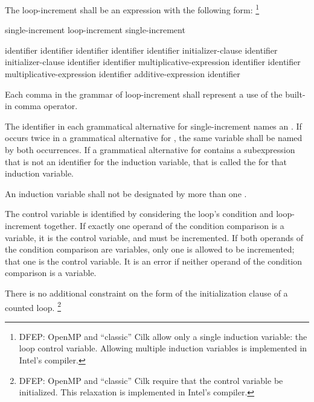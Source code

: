 \pnum
The loop-increment shall be an expression with the following form:%
\footnote{DFEP:
OpenMP and ``classic'' Cilk allow only a single induction variable:
the loop control variable.
Allowing multiple induction variables is implemented in Intel's compiler.
}

\begin{bnf}
\br
single-increment
\br
loop-increment \terminal{,} single-increment
\end{bnf}

\begin{bnf}
\br
identifier \terminal{++}
\br
identifier \terminal{--}
\br
\terminal{++} identifier
\br
\terminal{--} identifier
\br
identifier \terminal{+=} initializer-clause
\br
identifier \terminal{-=} initializer-clause
\br
identifier \terminal{=} identifier \terminal{+} multiplicative-expression
\br
identifier \terminal{=} identifier \terminal{-} multiplicative-expression
\br
identifier \terminal{=} additive-expression \terminal{+} identifier
\end{bnf}

\pnum
\begin{cpp}
Each comma in the grammar of loop-increment shall represent
a use of the built-in comma operator.
\end{cpp}
The identifier in each grammatical alternative for single-increment
names an
.
If
occurs twice in a grammatical alternative for
,
the same variable shall be named by both occurrences.
If a grammatical alternative for
contains a subexpression
that is not an identifier for the induction variable,
that is called the
for that induction variable.

\pnum
An induction variable shall not be designated by more than one
.

\begin{note}
The control variable is identified by considering
the loop's condition and loop-increment together.
If exactly one operand of the condition comparison is a variable,
it is the control variable, and must be incremented.
If both operands of the condition comparison are variables,
only one is allowed to be incremented;
that one is the control variable.
It is an error if neither operand of the condition comparison is a variable.
\end{note}

\begin{note}
There is no additional constraint on the form
of the initialization clause of a counted  loop.%
\footnote{DFEP:
OpenMP and ``classic'' Cilk require that the control variable be initialized.
This relaxation is implemented in Intel's compiler.
}
\end{note}

